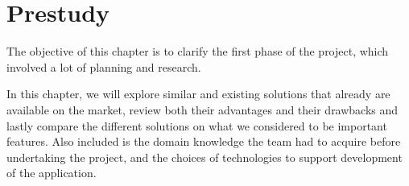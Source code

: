\chapter{Prestudy}

The objective of this chapter is to clarify the first phase of the project, which involved a lot of planning and research. 

In this chapter, we will explore similar and existing solutions that already are available on the market, review both their advantages and their drawbacks and lastly compare the different solutions on what we considered to be important features. Also included is the domain knowledge the team had to acquire before undertaking the project, and the choices of technologies to support development of the application.


\newpage




